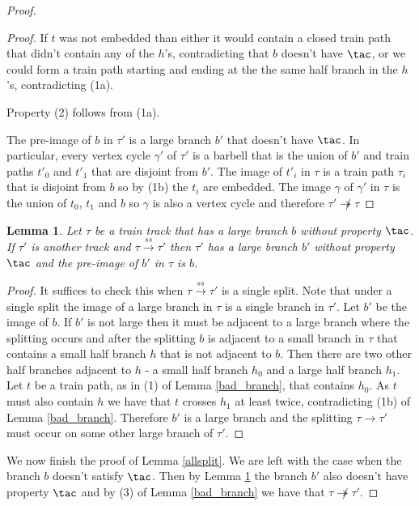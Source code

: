 \documentclass[11pt]{article}
\newtheorem{lemma}[thm]{Lemma}
\theoremstyle{remark}
\def\t{{\tau}}
\def\ss{{\overset{ss}\longrightarrow}}
\begin{document}
\begin{proof}
\begin{proof}
If $t$ was not embedded than either it would contain a closed train path that didn't contain any of the $h$'s, contradicting that $b$ doesn't have $\tac$, or we could form a train path starting and ending at the the same half branch in the $h$'s, contradicting (1a).

Property (2) follows from (1a).

The pre-image of $b$ in $\tau'$ is a large branch $b'$ that doesn't have $\tac$. In particular, every vertex cycle $\gamma'$ of $\tau'$ is a barbell that is the union of $b'$ and train paths $t'_0$ and $t'_1$ that are disjoint from $b'$. The image of $t'_i$ in $\tau$ is a train path $\t_i$ that is disjoint from $b$ so by (1b) the $t_i$ are embedded. The image $\gamma$ of $\gamma'$ in $\tau$ is the union of $t_0$, $t_1$ and $b$ so $\gamma$ is also a vertex cycle and therefore $\tau'\not\twoheadrightarrow\tau$
\end{proof}

\begin{lemma}\label{bad_branch_stays}
Let $\tau$ be a train track that has a large branch $b$ without property $\tac$. If $\tau'$ is another track and $\tau\ss \tau'$ then $\tau'$ has a large branch $b'$ without property $\tac$ and the pre-image of $b'$ in $\tau$ is $b$.
\end{lemma}

\begin{proof}
It suffices to check this when $\tau\ss\tau'$ is a single split. Note that under a single split the image of a large branch in $\tau$ is a single branch in $\tau'$. Let $b'$ be the image of $b$. If $b'$ is not large then it must be adjacent to a large branch where the splitting occurs and after the splitting $b$ is adjacent to a small branch in $\tau$ that contains a small half branch $h$ that is not adjacent to $b$. Then there are two other half branches adjacent to $h$ - a small half branch $h_0$ and a large half branch $h_1$. Let $t$ be a train path, as in (1) of Lemma \ref{bad_branch}, that contains $h_0$. As $t$ must also contain $h$ we have that $t$ crosses $h_1$ at least twice, contradicting (1b) of Lemma \ref{bad_branch}. Therefore $b'$ is a large branch and the splitting $\tau\to\tau'$ must occur on some other large branch of $\tau'$. 
\end{proof}


We now finish the proof of Lemma \ref{allsplit}. We are left with the case when the branch $b$ doesn't satisfy $\tac$. Then by Lemma \ref{bad_branch_stays} the branch $b'$ also doesn't have property $\tac$ and by (3) of Lemma \ref{bad_branch} we have that $\tau\not\twoheadrightarrow\tau'$.
\end{proof}
\end{document}
